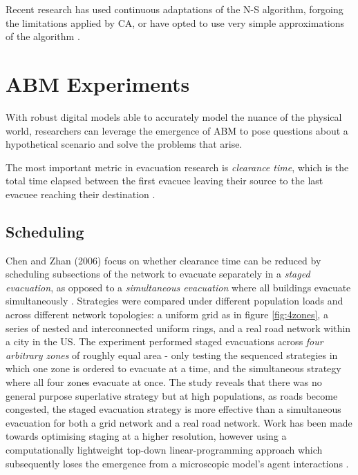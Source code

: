 Recent research has used continuous adaptations of the N-S algorithm, forgoing the limitations applied by CA, or have opted to use very simple approximations of the algorithm \cite{Durak2015OptimizingAlgorithms,Madireddy2011AnManagement}.


\section{ABM Experiments}

With robust digital models able to accurately model the nuance of the physical world, researchers can leverage the emergence of ABM to pose questions about a hypothetical scenario and solve the problems that arise. 

The most important metric in evacuation research is \textit{clearance time}, which is the total time elapsed between the first evacuee leaving their source to the last evacuee reaching their destination \cite{Shendarkar2006CrowdReality,Madireddy2011AnManagement}.

\subsection{Scheduling}
Chen and Zhan (2006) focus on whether clearance time can be reduced by scheduling subsections of the network to evacuate separately in a \textit{staged evacuation}, as opposed to a \textit{simultaneous evacuation} where all buildings evacuate simultaneously \cite{Chen2008Agent-basedStrategies}. Strategies were compared under different population loads and across different network topologies: a uniform grid as in figure \ref{fig:4zones}, a series of nested and interconnected uniform rings, and a real road network within a city in the US. The experiment performed staged evacuations across \textit{four arbitrary zones} of roughly equal area - only testing the sequenced strategies in which one zone is ordered to evacuate at a time, and the simultaneous strategy where all four zones evacuate at once. The study reveals that there was no general purpose superlative strategy but at high populations, as roads become congested, the staged evacuation strategy is more effective than a simultaneous evacuation for both a grid network and a real road network. Work has been made towards optimising staging at a higher resolution, however using a computationally lightweight top-down linear-programming approach which subsequently loses the emergence from a microscopic model's agent interactions \cite{Bish2014OptimalRouting}.


